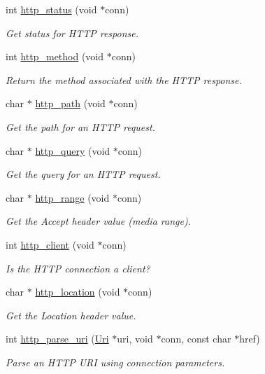 \begin{DoxyCompactItemize}
int \hyperlink{group__http__connection_gaab725405e3c788f0b9b72d3a3cc5d2f3}{http\+\_\+status} (void $\ast$conn)
\begin{DoxyCompactList}\small\item\em Get status for H\+T\+TP response. \end{DoxyCompactList}\item 
int \hyperlink{group__http__connection_ga588ce3ea3e16dab03a96b65b9d58d0dc}{http\+\_\+method} (void $\ast$conn)
\begin{DoxyCompactList}\small\item\em Return the method associated with the H\+T\+TP response. \end{DoxyCompactList}\item 
char $\ast$ \hyperlink{group__http__connection_ga8cf07b868935828ebfe2b80c8b3d135e}{http\+\_\+path} (void $\ast$conn)
\begin{DoxyCompactList}\small\item\em Get the path for an H\+T\+TP request. \end{DoxyCompactList}\item 
char $\ast$ \hyperlink{group__http__connection_gae61eeb371ab52758dcdc2e376c32d7c1}{http\+\_\+query} (void $\ast$conn)
\begin{DoxyCompactList}\small\item\em Get the query for an H\+T\+TP request. \end{DoxyCompactList}\item 
char $\ast$ \hyperlink{group__http__connection_ga5e069d5d6ad16d184f959507c7e3bea8}{http\+\_\+range} (void $\ast$conn)
\begin{DoxyCompactList}\small\item\em Get the Accept header value (media range). \end{DoxyCompactList}\item 
int \hyperlink{group__http__connection_gad00b80f2f0573963fb7f6f0227fc748a}{http\+\_\+client} (void $\ast$conn)
\begin{DoxyCompactList}\small\item\em Is the H\+T\+TP connection a client? \end{DoxyCompactList}\item 
char $\ast$ \hyperlink{group__http__connection_gaf4fb8bd1fa38b29e340be73efac05a40}{http\+\_\+location} (void $\ast$conn)
\begin{DoxyCompactList}\small\item\em Get the Location header value. \end{DoxyCompactList}\item 
int \hyperlink{group__http__connection_ga08146812d01ea110926efc6dbf39b91d}{http\+\_\+parse\+\_\+uri} (\hyperlink{structUri}{Uri} $\ast$uri, void $\ast$conn, const char $\ast$href)
\begin{DoxyCompactList}\small\item\em Parse an H\+T\+TP U\+RI using connection parameters. \end{DoxyCompactList}\end{DoxyCompactItemize}


